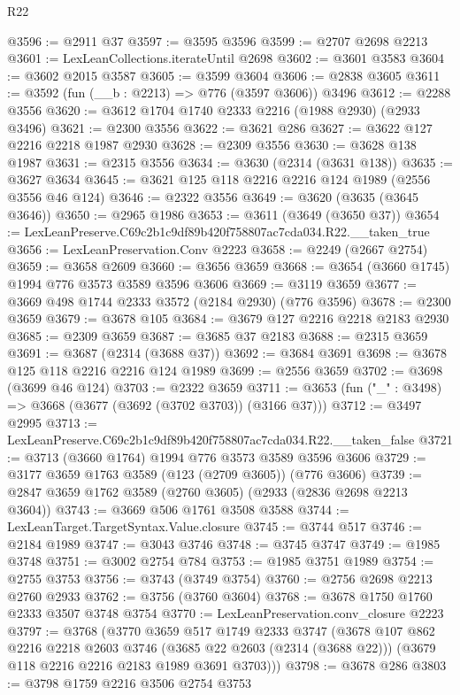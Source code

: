 \begin{lexlean}{R22}
\begin{coremodule}
@3596 := @2911 @37
@3597 := @3595 @3596
@3599 := @2707 @2698 @2213
@3601 := LexLeanCollections.iterateUntil @2698
@3602 := @3601 @3583
@3604 := @3602 @2015 @3587
@3605 := @3599 @3604
@3606 := @2838 @3605
@3611 := @3592 (fun (__b : @2213) => @776 (@3597 @3606)) @3496
@3612 := @2288 @3556
@3620 := @3612 @1704 @1740 @2333 @2216 (@1988 @2930) (@2933 @3496)
@3621 := @2300 @3556
@3622 := @3621 @286
@3627 := @3622 @127 @2216 @2218 @1987 @2930
@3628 := @2309 @3556
@3630 := @3628 @138 @1987
@3631 := @2315 @3556
@3634 := @3630 (@2314 (@3631 @138))
@3635 := @3627 @3634
@3645 := @3621 @125 @118 @2216 @2216 @124 @1989 (@2556 @3556 @46 @124)
@3646 := @2322 @3556
@3649 := @3620 (@3635 (@3645 @3646))
@3650 := @2965 @1986
@3653 := @3611 (@3649 (@3650 @37))
@3654 := LexLeanPreserve.C69c2b1c9df89b420f758807ac7cda034.R22.__taken_true
@3656 := LexLeanPreservation.Conv @2223
@3658 := @2249 (@2667 @2754)
@3659 := @3658 @2609
@3660 := @3656 @3659
@3668 := @3654 (@3660 @1745) @1994 @776 @3573 @3589 @3596 @3606
@3669 := @3119 @3659
@3677 := @3669 @498 @1744 @2333 @3572 (@2184 @2930) (@776 @3596)
@3678 := @2300 @3659
@3679 := @3678 @105
@3684 := @3679 @127 @2216 @2218 @2183 @2930
@3685 := @2309 @3659
@3687 := @3685 @37 @2183
@3688 := @2315 @3659
@3691 := @3687 (@2314 (@3688 @37))
@3692 := @3684 @3691
@3698 := @3678 @125 @118 @2216 @2216 @124 @1989
@3699 := @2556 @3659
@3702 := @3698 (@3699 @46 @124)
@3703 := @2322 @3659
@3711 := @3653 (fun ("_" : @3498) => @3668 (@3677 (@3692 (@3702 @3703)) (@3166 @37)))
@3712 := @3497 @2995
@3713 := LexLeanPreserve.C69c2b1c9df89b420f758807ac7cda034.R22.__taken_false
@3721 := @3713 (@3660 @1764) @1994 @776 @3573 @3589 @3596 @3606
@3729 := @3177 @3659 @1763 @3589 (@123 (@2709 @3605)) (@776 @3606)
@3739 := @2847 @3659 @1762 @3589 (@2760 @3605) (@2933 (@2836 @2698 @2213 @3604))
@3743 := @3669 @506 @1761 @3508 @3588
@3744 := LexLeanTarget.TargetSyntax.Value.closure
@3745 := @3744 @517
@3746 := @2184 @1989
@3747 := @3043 @3746
@3748 := @3745 @3747
@3749 := @1985 @3748
@3751 := @3002 @2754 @784
@3753 := @1985 @3751 @1989
@3754 := @2755 @3753
@3756 := @3743 (@3749 @3754)
@3760 := @2756 @2698 @2213 @2760 @2933
@3762 := @3756 (@3760 @3604)
@3768 := @3678 @1750 @1760 @2333 @3507 @3748 @3754
@3770 := LexLeanPreservation.conv_closure @2223
@3797 := @3768
    (@3770
      @3659
      @517
      @1749
      @2333
      @3747
      (@3678
        @107
        @862
        @2216
        @2218
        @2603
        @3746
        (@3685 @22 @2603 (@2314 (@3688 @22)))
        (@3679 @118 @2216 @2216 @2183 @1989 @3691 @3703)))
@3798 := @3678 @286
@3803 := @3798 @1759 @2216 @3506 @2754 @3753

\end{coremodule}
\end{lexlean}
